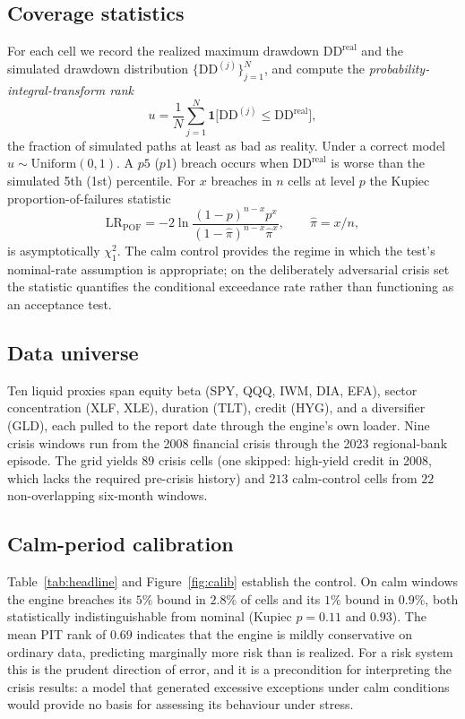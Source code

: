 \documentclass[11pt]{article}
\newcommand{\dd}{\mathrm{DD}}
\newcommand{\ind}{\mathbf{1}}
\theoremstyle{definition}
\begin{document}
\subsection{Coverage statistics}
For each cell we record the realized maximum drawdown $\dd^{\text{real}}$ and the
simulated drawdown distribution $\{\dd^{(j)}\}_{j=1}^N$, and compute the
\emph{probability-integral-transform rank}
\begin{equation}
  u = \frac1N\sum_{j=1}^N\ind\!\bigl[\dd^{(j)}\le\dd^{\text{real}}\bigr],
\end{equation}
the fraction of simulated paths at least as bad as reality. Under a correct
model $u\sim\mathrm{Uniform}(0,1)$. A $p5$ ($p1$) breach occurs when
$\dd^{\text{real}}$ is worse than the simulated 5th (1st) percentile. For $x$
breaches in $n$ cells at level $p$ the Kupiec proportion-of-failures statistic
\begin{equation}
  \mathrm{LR}_{\mathrm{POF}}
  = -2\ln\frac{(1-p)^{n-x}p^{x}}{(1-\hat\pi)^{n-x}\hat\pi^{x}},
  \qquad \hat\pi=x/n,
\end{equation}
is asymptotically $\chi^2_1$. The calm control provides the regime in which the
test's nominal-rate assumption is appropriate; on the deliberately adversarial
crisis set the statistic quantifies the conditional exceedance rate rather than
functioning as an acceptance test.

\subsection{Data universe}
Ten liquid proxies span equity beta (SPY, QQQ, IWM, DIA, EFA), sector
concentration (XLF, XLE), duration (TLT), credit (HYG), and a diversifier (GLD),
each pulled to the report date through the engine's own loader. Nine crisis
windows run from the 2008 financial crisis through the 2023 regional-bank
episode. The grid yields $89$ crisis cells (one skipped: high-yield credit in
2008, which lacks the required pre-crisis history) and $213$ calm-control cells
from $22$ non-overlapping six-month windows.

\subsection{Calm-period calibration}
Table~\ref{tab:headline} and Figure~\ref{fig:calib} establish the control. On calm
windows the engine breaches its $5\%$ bound in $2.8\%$ of cells and its $1\%$ bound
in $0.9\%$, both statistically indistinguishable from nominal (Kupiec $p=0.11$ and
$0.93$). The mean PIT rank of $0.69$ indicates that the engine is mildly
conservative on ordinary data, predicting marginally more risk than is realized.
For a risk system this is the prudent direction of error, and it is a precondition
for interpreting the crisis results: a model that generated excessive exceptions
under calm conditions would provide no basis for assessing its behaviour under
stress.
\end{document}
